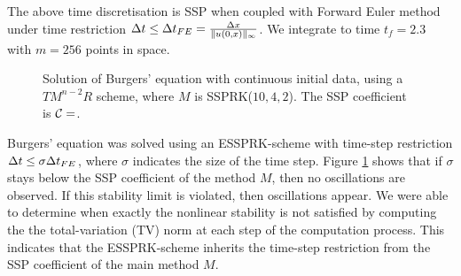 The above time discretisation is SSP when coupled with Forward Euler method 
under time restriction $\Delta t \leq {\Delta t}_{FE} = \frac{\Delta x}{\|u(0,x)\|_{\infty}}$. 
We integrate to time $t_{f} = 2.3$ with $m = 256$ points in space.
\newline

\begin{figure}[t!]
    \centering
    \caption{Solution of Burgers' equation with continuous initial data, using a 
    $TM^{n-2}R$ scheme, where $ M $ is SSPRK($10,4,2$). 
    The SSP coefficient is $\mathcal{C} =$.}
    \label{fig:burgers_cont}
\end{figure}

Burgers' equation was solved using an ESSPRK-scheme with time-step 
restriction $\Delta t \leq \sigma{\Delta t}_{FE}$, where $\sigma$ indicates the size 
of the time step. 
Figure \ref{fig:burgers_cont} shows that if $\sigma$ stays below the SSP 
coefficient of the method $M$, then no oscillations are observed. 
If this stability limit is violated, then oscillations appear. 
We were able to determine when exactly the nonlinear stability is not 
satisfied by computing the the total-variation (TV) norm at each step of the 
computation process. 
This indicates that the ESSPRK-scheme inherits the time-step restriction 
from the SSP coefficient of the main method $M$.
\newline

